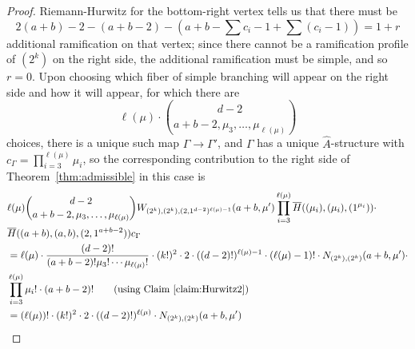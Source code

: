 \documentclass[thesis]{thesis-umich}           %
\theoremstyle{definition}
\begin{document}
\begin{proof}

  Riemann-Hurwitz for the bottom-right vertex tells us that there must be
  \[
  2(a+b)-2-(a+b-2)-\left(a+b-\sum c_i-1+\sum(c_i-1)\right)=1+r
  \]
  additional ramification on that vertex; since there cannot be a ramification profile of $(2^k)$
  on the right side, the additional ramification must be simple, and so $r=0$.
  Upon
  choosing which fiber of simple branching will appear on the right side and how it will appear,
  for which there are
  \[
  \ell(\mu)\cdot \binom{d-2}{a+b-2,\mu_3,\dots,\mu_{\ell(\mu)}}
  \]
  choices, there is a unique such map $\Gamma\to\Gamma'$, and $\Gamma$ has a unique $\hat A$-structure
  with $c_{\Gamma}=\prod\limits_{i=3}^{\ell(\mu)}\mu_i$, so the corresponding contribution to the right side of Theorem~\ref{thm:admissible} in this case is
  \begin{align*}
    &\ell(\mu)\binom{d-2}{a+b-2,\mu_3,\dots,\mu_{\ell(\mu)}} W_{(2^k),(2^k),(2,1^{d-2})^{\ell(\mu)-1}}(a+b,\mu') \prod_{i=3}^{\ell(\mu)}\overline H((\mu_i),(\mu_i),(1^{\mu_i})) \cdot \\
    &\overline H((a+b),(a,b),(2,1^{a+b-2})) c_{\Gamma} \\
    &=\ell(\mu)\cdot\frac{(d-2)!}{(a+b-2)!\mu_3!\cdots\mu_{\ell(\mu)}!}\cdot (k!)^2\cdot 2\cdot((d-2)!)^{\ell(\mu)-1}\cdot (\ell(\mu)-1)!\cdot N_{(2^k),(2^k)}(a+b,\mu')\cdot \\
    &\prod_{i=3}^{\ell(\mu)}\mu_i!\cdot (a+b-2)! \tag*{(using Claim~\ref{claim:Hurwitz2})} \\
    &=(\ell(\mu))!\cdot (k!)^2\cdot 2\cdot((d-2)!)^{\ell(\mu)}\cdot N_{(2^k),(2^k)}(a+b,\mu') \\
  \end{align*}


\end{proof}
\end{document}
